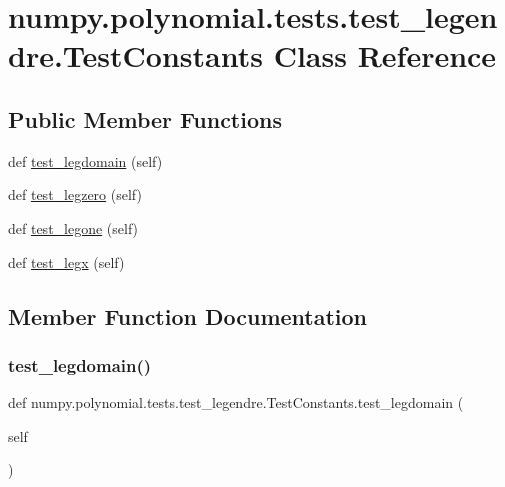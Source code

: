 \hypertarget{classnumpy_1_1polynomial_1_1tests_1_1test__legendre_1_1TestConstants}{}\section{numpy.\+polynomial.\+tests.\+test\+\_\+legendre.\+Test\+Constants Class Reference}
\label{classnumpy_1_1polynomial_1_1tests_1_1test__legendre_1_1TestConstants}
\subsection*{Public Member Functions}
\begin{DoxyCompactItemize}
\item 
def \hyperlink{classnumpy_1_1polynomial_1_1tests_1_1test__legendre_1_1TestConstants_a26333fc77ea62e96dea34261e9a694d6}{test\+\_\+legdomain} (self)
\item 
def \hyperlink{classnumpy_1_1polynomial_1_1tests_1_1test__legendre_1_1TestConstants_ac2a1c03ebfbc9f73d457184da2350cf4}{test\+\_\+legzero} (self)
\item 
def \hyperlink{classnumpy_1_1polynomial_1_1tests_1_1test__legendre_1_1TestConstants_acbfeb131cf07717df66d21ff4e427ce8}{test\+\_\+legone} (self)
\item 
def \hyperlink{classnumpy_1_1polynomial_1_1tests_1_1test__legendre_1_1TestConstants_acbf98ee697d4e6487994efda951fc80d}{test\+\_\+legx} (self)
\end{DoxyCompactItemize}


\subsection{Member Function Documentation}
\mbox{\label{classnumpy_1_1polynomial_1_1tests_1_1test__legendre_1_1TestConstants_a26333fc77ea62e96dea34261e9a694d6}} 
\subsubsection{\texorpdfstring{test\+\_\+legdomain()}{test\_legdomain()}}
{\footnotesize\ttfamily def numpy.\+polynomial.\+tests.\+test\+\_\+legendre.\+Test\+Constants.\+test\+\_\+legdomain (\begin{DoxyParamCaption}\item[{}]{self }\end{DoxyParamCaption})}

